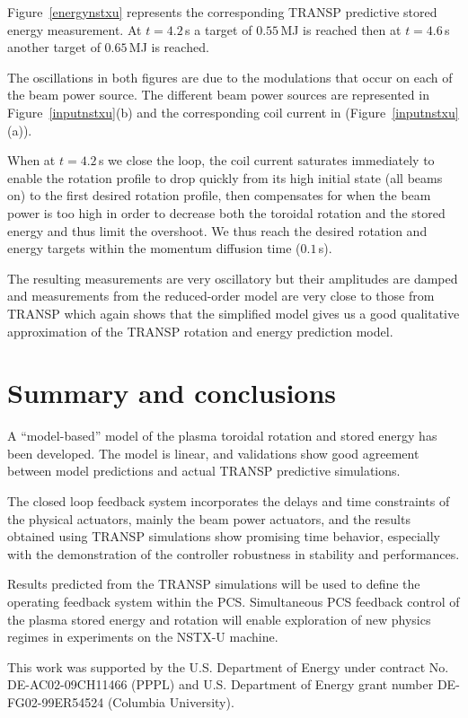 \documentclass[12pt,lot, lof]{puthesis}
\begin{document}
Figure~\ref{energynstxu} represents the corresponding TRANSP predictive stored energy measurement.
At $t = 4.2$\,s a target of $0.55$\,MJ is reached then at $t=4.6$\,s another target of $0.65$\,MJ is reached.

The oscillations in both figures are due to the modulations that occur on each of the beam power source. The different beam power sources are represented in Figure~\ref{inputnstxu}(b) and the corresponding coil current in (Figure~\ref{inputnstxu}(a)). 

When at $t = 4.2$\,s we close the loop, the coil current saturates immediately to enable the rotation profile to drop quickly from its high initial state (all beams on) to the first desired rotation profile, then compensates for when the beam power is too high in order to decrease both the toroidal rotation and the stored energy and thus limit the overshoot. We thus reach the desired rotation and energy targets within the momentum diffusion time ($0.1$\,s).

The resulting measurements are very oscillatory but their amplitudes are damped and measurements from the reduced-order model are very close to those from TRANSP which again shows that the simplified model gives us a good qualitative approximation of the TRANSP rotation and energy prediction model.

\section{Summary and conclusions}
\label{conclusions10}

A ``model-based'' model of the plasma toroidal rotation and stored energy has been developed. The model is linear, and validations show good agreement between  model  predictions  and  actual  TRANSP predictive simulations.

The closed loop feedback system incorporates the delays and time constraints of the physical actuators, mainly the beam power actuators, and the results obtained using TRANSP simulations show promising time behavior, especially with the demonstration of the controller robustness in stability and performances.

Results predicted from the TRANSP simulations will be used to define the operating feedback system within the PCS. Simultaneous PCS feedback control of the plasma stored energy and rotation will enable exploration of new physics regimes in experiments on the NSTX-U machine.


This work was supported by the U.S. Department of Energy under contract No. DE-AC02-09CH11466 (PPPL) and U.S. Department of Energy  grant number DE-FG02-99ER54524 (Columbia University). 






\singlespacing


\cleardoublepage
\ifdefined{}
\else
\fi
{}


%
\end{document}
